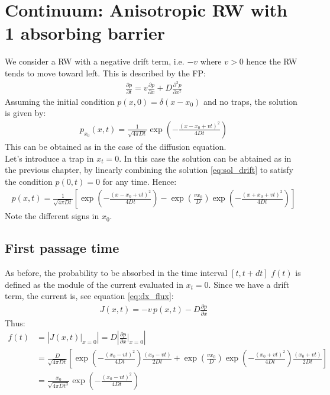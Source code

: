 \documentclass[4apaper,11pt,fleqn]{article}
\theoremstyle{remark}
\theoremstyle{definition}
\begin{document}
\section{Continuum: Anisotropic RW with 1 absorbing barrier}
We consider a RW with a negative drift term, i.e. $-v $ where $v>0$ hence the RW tends to move toward left. This is described by the FP:
\begin{align*}
  \frac{\partial p}{\partial t}=v \frac{\partial p}{\partial x}+D \frac{\partial^{2} p}{\partial x^{2}}
\end{align*}
Assuming the initial condition $p(x,0)=\delta (x-x_0)$  and no traps, the solution is given by:
\begin{align}
  \label{eq:sol_drift}
  p_{x_{0}}(x, t)=\frac{1}{\sqrt{4 \pi D t}} \exp \left(-\frac{\left(x-x_{0}+v t\right)^{2}}{4 D t}\right)
\end{align}
This can be obtained as in the case of the diffusion equation.\\
Let's introduce a trap in $x_t=0$. In this case the solution  can be abtained as in the previous chapter, by linearly combining the solution \eqref{eq:sol_drift} to satisfy the condition $p(0,t)=0$ for any time.
Hence:
\begin{align*}
  p(x, t)=\frac{1}{\sqrt{4 \pi D t}}\left[\exp \left(-\frac{\left(x-x_{0}+v t\right)^{2}}{4 D t}\right)-\exp \left(\frac{v x_{0}}{D}\right) \exp \left(-\frac{\left(x+x_{0}+v t\right)^{2}}{4 D t}\right)\right]
\end{align*}
Note the different signs in $x_0$.


\subsection{First passage time}
As before, the probability to be absorbed in the time interval $[t,t+dt]$ $f(t)$ is defined as the module of the current evaluated in $x_t=0$. Since we have a drift term, the current is, see equation \eqref{eq:dx_flux}:
\begin{align*}
  J(x,t) = -v\, p(x,t) -D \frac{\partial p}{\partial x}
\end{align*}
Thus:
\begin{align*}
  f (t) &= \left|  J(x,t) \Bigr|_{x=0} \right| = D \left| \frac{\partial p}{\partial x} \Bigr|_{x=0} \right| \\
        &= \frac{D}{\sqrt{4 \pi D t}}\left[\exp \left(-\frac{\left(x_{0}-v t\right)^{2}}{4 D t}\right) \frac{\left(x_{0}-v t\right)}{2 D t}+ \exp \left(\frac{v x_{0}}{D}\right) \exp \left(-\frac{\left(x_{0}+v t\right)^{2}}{4 D t}\right) \frac{\left(x_{0}+v t\right)}{2 D t}\right] \\
        &= \frac{x_{0}}{\sqrt{4 \pi D t^{3}}} \exp \left(-\frac{\left(x_{0}-v t\right)^{2}}{4 D t}\right)
\end{align*}
\end{document}
